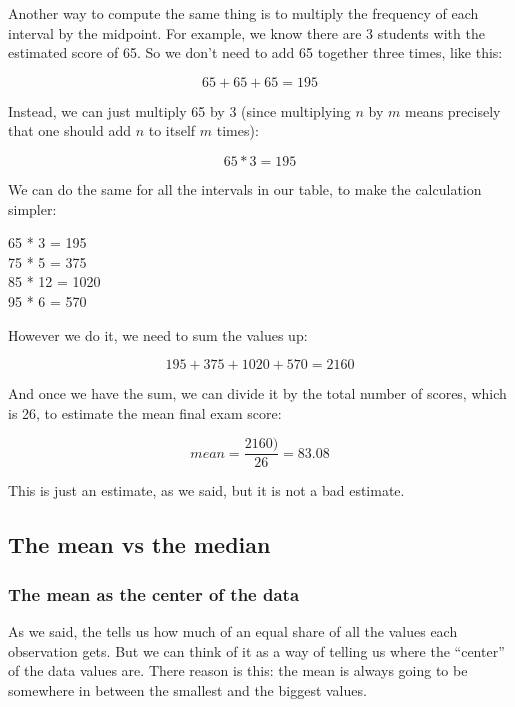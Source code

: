 \documentclass[../../../main.tex]{subfiles}
\begin{document}
\noindent
Another way to compute the same thing is to multiply the frequency of each interval by the midpoint. For example, we know there are 3 students with the estimated score of 65. So we don't need to add 65 together three times, like this:

\begin{equation*}
  65 + 65 + 65 = 195
\end{equation*}

\noindent
Instead, we can just multiply 65 by 3 (since multiplying $n$ by $m$ means precisely that one should add $n$ to itself $m$ times):

\begin{equation*}
  65 * 3 = 195
\end{equation*}

\noindent
We can do the same for all the intervals in our table, to make the calculation simpler:

\begin{center}
  65 * 3 =  195 \\
  75 * 5 = 375 \\
  85 * 12 = 1020 \\
  95 * 6 = 570
\end{center}

\noindent
However we do it, we need to sum the values up:

\begin{equation*}
  195 + 375 + 1020 + 570 = 2160
\end{equation*}

\noindent
And once we have the sum, we can divide it by the total number of scores, which is 26, to estimate the mean final exam score:

\begin{equation*}
  mean = \frac{2160)}{26} = 83.08
\end{equation*}

\noindent
This is just an estimate, as we said, but it is not a bad estimate.


\subsection{The mean vs the median}

\subsubsection{The mean as the center of the data}

As we said, the  tells us how much of an equal share of all the values each observation gets. But we can think of it as a way of telling us where the ``center'' of the data values are. There reason is this: the mean is always going to be somewhere in between the smallest and the biggest values. 
\end{document}
